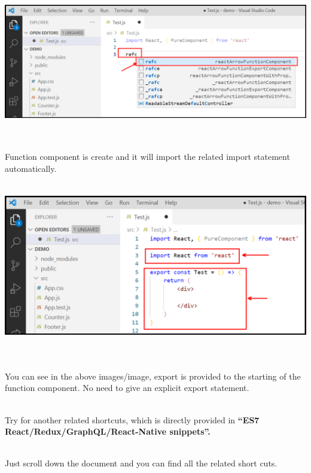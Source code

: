 \documentclass{article}
\begin{document}
\begin{center}
	\noindent \includegraphics*[width=6.17in, height=2.31in]{IMG-07-07}
\end{center}

\noindent 

\noindent 

\noindent 

\noindent 

\noindent 

\noindent 

\noindent 

\noindent\\
\newpage
\noindent Function component is create and it will import the related import statement automatically.

\begin{center}
	\noindent \includegraphics*[width=6.25in, height=2.87in]{IMG-07-08}
\end{center}

\noindent 

\noindent 

\noindent\\
 You can see in the above images/image, export is provided to the starting of the function component. No need to give an explicit export statement.

\noindent 

\noindent\\
 \textbf{} Try for another related shortcuts, which is directly provided in \textbf{``ES7 React/Redux/GraphQL/React-Native snippets''.}

\noindent 

\noindent\\
 Just scroll down the document and you can find all the related short cuts.
\end{document}
